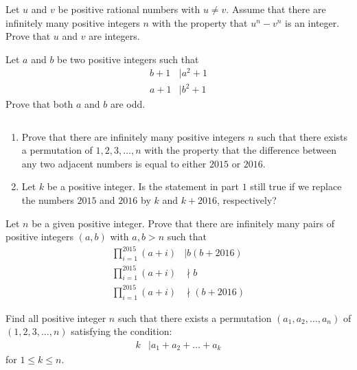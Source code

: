 \documentclass[problems.tex]{subfile}
\begin{document}
	\begin{problem}
		Let $u$ and $v$ be positive rational numbers with $u \neq v$. Assume that there are infinitely many positive integers $n$ with the property that $u^n - v^n$ is an integer. Prove that $u$ and $v$ are integers.
	\end{problem}

	\begin{problem}
		Let $a$ and $b$ be two positive integers such that
		\begin{align*}
			b + 1
				& \mid a^2 + 1\\
			a + 1
				& \mid b^2 + 1
		\end{align*}
		Prove that both $a$ and $b$ are odd.
	\end{problem}

	\begin{problem}
		$ $
		\begin{enumerate}
			\item Prove that there are infinitely many positive integers $n$ such that there exists a permutation of $1, 2,3, \dots, n$ with the property that the difference between any two adjacent numbers is equal to either $2015$ or $2016$.
			\item Let $k$ be a positive integer. Is the statement in part $1$ still true if we replace the numbers $2015$ and $2016$ by $k$ and $k + 2016$, respectively?
		\end{enumerate}
	\end{problem}

	\begin{problem}
		Let $n$ be a given positive integer. Prove that there are infinitely many pairs of positive integers $(a, b)$ with $a, b > n$ such that
		\begin{align*}
			\prod_{i=1}^{2015} (a+i) &\mid b(b+2016)\\
			\prod_{i=1}^{2015} (a+i) &\nmid b\\
			\prod_{i=1}^{2015} (a+i) &\nmid (b+2016)
		\end{align*}
	\end{problem}

	\begin{problem}
		Find all positive integer $n$ such that there exists a permutation $(a_1, a_2,\dots , a_n)$ of $(1, 2,3, \dots, n)$ satisfying the condition:
			\begin{align*}
				k
					& \mid a_1 + a_2 + \ldots+ a_k
			\end{align*}
		for $1\leq k\leq n$.
	\end{problem}
\end{document}
